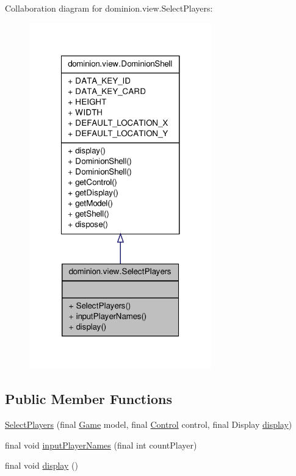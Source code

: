 \-Collaboration diagram for dominion.\-view.\-Select\-Players\-:
\nopagebreak
\begin{figure}[H]
\begin{center}
\leavevmode
\includegraphics[width=224pt]{classdominion_1_1view_1_1SelectPlayers__coll__graph}
\end{center}
\end{figure}
\subsection*{\-Public \-Member \-Functions}
\begin{DoxyCompactItemize}
\item 
\hyperlink{classdominion_1_1view_1_1SelectPlayers_adc552a5cdfe82149f52e26f253d5d19f}{\-Select\-Players} (final \hyperlink{interfacedominion_1_1model_1_1Game}{\-Game} model, final \hyperlink{interfacedominion_1_1control_1_1Control}{\-Control} control, final \-Display \hyperlink{classdominion_1_1view_1_1SelectPlayers_a69f57728c1d779110d3101ed046621aa}{display})
\item 
final void \hyperlink{classdominion_1_1view_1_1SelectPlayers_ad2fb00742fc5afe0805ecf130456019a}{input\-Player\-Names} (final int count\-Player)
\item 
final void \hyperlink{classdominion_1_1view_1_1SelectPlayers_a69f57728c1d779110d3101ed046621aa}{display} ()
\end{DoxyCompactItemize}


